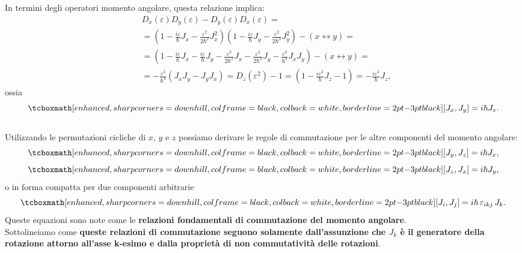 In termini degli operatori momento angolare, questa relazione implica:
	\begin{align}
		& D_x (\varepsilon)D_y (\varepsilon)-D_y (\varepsilon)D_x (\varepsilon)= \nonumber\\
		&  = \left(1-\frac{i\varepsilon}{\hbar} J_x -\frac{\varepsilon ^2}{2\hbar ^2}J_x ^2\right)\left(1-\frac{i\varepsilon}{\hbar} J_y -\frac{\varepsilon ^2}{2\hbar ^2}J_y ^2\right)- \left( x \leftrightarrow y\right) =\nonumber \\
		& = \left(1-\frac{i\varepsilon}{\hbar} J_x-\frac{i\varepsilon}{\hbar} J_y-\frac{\varepsilon ^2}{2\hbar ^2}J_x-\frac{\varepsilon ^2}{2\hbar ^2}J_y-\frac{\varepsilon ^2}{\hbar ^2}J_xJ_y \right) - \left( x \leftrightarrow y\right) = \nonumber \\
		&  = -\frac{\varepsilon ^2}{\hbar ^2}\left(J_xJ_y-J_y J_x\right) = D_z (\varepsilon ^2)- 1= \left(1-\frac{i\varepsilon ^2}{\hbar} J_z-1\right)=-\frac{i\varepsilon ^2}{\hbar} J_z, 
	\end{align}
ossia
	\begin{equation}
		\tcboxmath[enhanced, sharp corners=downhill, colframe=black, colback=white, borderline={2pt}{-3pt}{black}]{
			[ J_x, J_y ] = i\hbar J_z.
			 }
	\end{equation}\\
	
Utilizzando le permutazioni cicliche di $x$, $y$ e $z$ possiamo derivare le regole di commutazione per le altre componenti del momento angolare:
	\begin{equation}
		\tcboxmath[enhanced, sharp corners=downhill, colframe=black, colback=white, borderline={2pt}{-3pt}{black}]{
			[ J_y, J_z ] = i\hbar J_x,
			}
	\end{equation}
	\begin{equation}
		\tcboxmath[enhanced, sharp corners=downhill, colframe=black, colback=white, borderline={2pt}{-3pt}{black}]{
			[ J_z, J_x ] = i\hbar J_y,
			}
	\end{equation}
o in forma compatta per due componenti arbitrarie
	\begin{equation}
		\tcboxmath[enhanced, sharp corners=downhill, colframe=black, colback=white, borderline={2pt}{-3pt}{black}]{
			[ J_i, J_j ] = i\hbar\, \varepsilon _{ikj}\,J_k.
			}
	\label{eq:cap16_1}
	\end{equation}
Queste equazioni sono note come le \textbf{relazioni fondamentali di commutazione del momento angolare}.\\

Sottolineiamo come \textbf{queste relazioni di commutazione seguono solamente dall'assunzione che $J_k$ è il generatore della rotazione attorno all'asse k-esimo e dalla proprietà di non commutatività delle rotazioni}.\\

